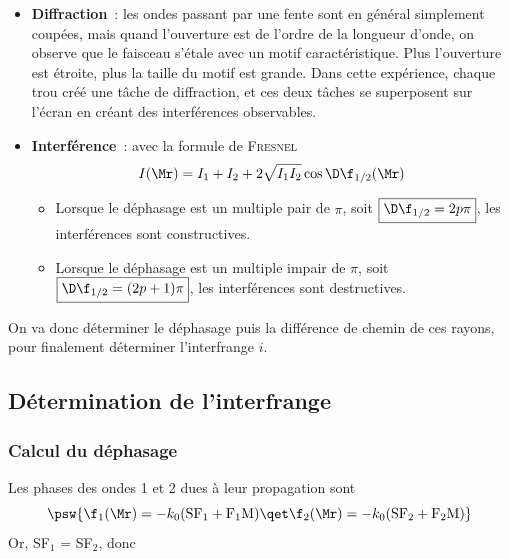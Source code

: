 \documentclass[../../main/main.tex]{subfiles}
\begin{document}
\begin{itemize}
	\item \textbf{Diffraction}~: les ondes passant par une fente sont en général
	      simplement coupées, mais quand l'ouverture est de l'ordre de la longueur
	      d'onde, on observe que le faisceau s'étale avec un motif
	      caractéristique. Plus l'ouverture est étroite, plus la taille du motif
	      est grande. Dans cette expérience, chaque trou créé une tâche de
	      diffraction, et ces deux tâches se superposent sur l'écran en créant des
	      interférences observables.
	\item \textbf{Interférence}~: avec la formule de \textsc{Fresnel}
	      \[I(\Mr) = I_1 + I_2 + 2\sqrt{I_1I_2}\cos\D\f_{1/2}(\Mr)\]
	      \begin{itemize}
		      \item Lorsque le déphasage est un multiple pair de $\pi$, soit
		            $\boxed{\D\f_{1/2} = 2p\pi}$, les interférences sont constructives.
		      \item Lorsque le déphasage est un multiple impair de $\pi$, soit
		            $\boxed{\D\f_{1/2} = (2p+1)\pi}$, les interférences sont
		            destructives.
	      \end{itemize}
\end{itemize}

On va donc déterminer le déphasage puis la différence de chemin de ces rayons,
pour finalement déterminer l'interfrange $i$.

\subsection{Détermination de l'interfrange}
\subsubsection{Calcul du déphasage}

Les phases des ondes 1 et 2 dues à leur propagation sont
\[\psw{
		\f_1({\Mr}) = -k_0({\rm SF_1 + F_1M})
		\qet
		\f_2({\Mr}) = -k_0({\rm SF_2 + F_2M})
	}\]
Or, SF$_1$ = SF$_2$, donc
\vspace{-20pt}
\end{document}
